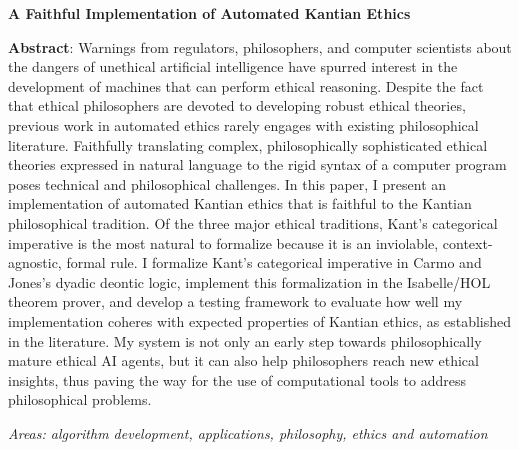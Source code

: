 \documentclass[11pt]{article}
\begin{document}
\noindent \textbf{A Faithful Implementation of Automated Kantian Ethics}

\medskip 

\noindent \textbf{Abstract}: Warnings from regulators, philosophers, and computer scientists about the 
dangers of unethical artificial intelligence have spurred interest in the development 
of machines that can perform ethical reasoning. Despite the fact that ethical philosophers are devoted to 
developing robust ethical theories, previous work in automated ethics rarely engages with existing 
philosophical literature. Faithfully translating complex, philosophically sophisticated ethical theories 
expressed in natural language to the rigid syntax of a computer program poses technical and philosophical 
challenges. In this paper, I present an implementation of automated Kantian 
ethics that is faithful to the Kantian philosophical tradition. Of the three major ethical 
traditions, Kant's categorical imperative is the most natural to formalize because it is an inviolable, 
context-agnostic, formal rule.  I formalize Kant's categorical imperative 
in Carmo and Jones's dyadic deontic logic, implement this formalization 
in the Isabelle/HOL theorem prover, and develop a testing framework to evaluate how well 
my implementation coheres with expected properties of Kantian ethics, as established in the literature. 
My system is not only an early step towards philosophically mature ethical AI agents, but it can also help
philosophers reach new ethical insights, thus paving the way for the use of computational tools to 
address philosophical problems.

\smallskip
\noindent \emph{Areas: algorithm development, applications, philosophy, ethics and automation}
\end{document}
